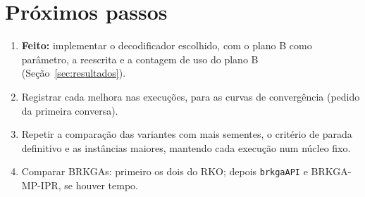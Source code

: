 \documentclass[11pt,a4paper]{article}
\begin{document}
\section{Próximos passos}
\begin{enumerate}[leftmargin=*,itemsep=2pt]
\item \textbf{Feito:} implementar o decodificador escolhido, com o plano B como parâmetro, a reescrita e a contagem de
  uso do plano B (Seção~\ref{sec:resultados}).
\item Registrar cada melhora nas execuções, para as curvas de convergência (pedido da primeira conversa).
\item Repetir a comparação das variantes com mais sementes, o critério de parada definitivo e as instâncias
  maiores, mantendo cada execução num núcleo fixo.
\item Comparar BRKGAs: primeiro os dois do RKO; depois \texttt{brkgaAPI} e BRKGA-MP-IPR, se houver tempo.
\end{enumerate}
\end{document}
